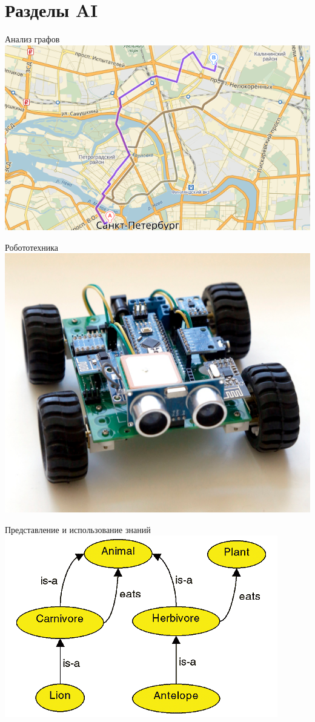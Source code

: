\documentclass[10pt]{beamer}
\begin{document}
\section{Разделы AI}

\begin{frame}{Анализ графов}
  \centering
  \includegraphics[width=0.8 \linewidth, height=0.8 \textheight, keepaspectratio]{images/maps}\\
\end{frame}

\begin{frame}{Робототехника}
  \centering
  \includegraphics[width=0.8 \linewidth, height=0.8 \textheight, keepaspectratio]{images/robot}\\
\end{frame}

\begin{frame}{Представление и использование знаний}
  \centering
  \includegraphics[width=0.8 \linewidth, height=0.8 \textheight, keepaspectratio]{images/ontology}\\
\end{frame}
\end{document}

